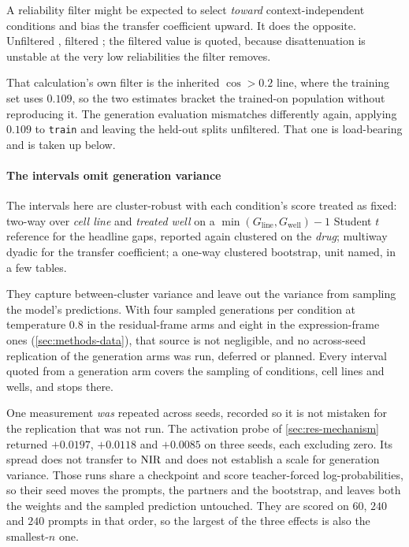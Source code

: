 A reliability filter might be expected to select \emph{toward}
context-in\-de\-pen\-dent conditions and bias the transfer coefficient upward.
It does the opposite. Unfiltered , filtered
; the filtered value is quoted, because disattenuation
is unstable at the very low reliabilities the filter removes.

That calculation's own filter is the inherited $\cos > 0.2$ line, where the
training set uses $0.109$, so the two estimates bracket the trained-on
population without reproducing it. The generation evaluation mismatches
differently again, applying $0.109$ to \texttt{train} and leaving the held-out
splits unfiltered. That one is load-bearing and is taken up below.

\paragraph{The intervals omit generation variance} The intervals here are
cluster-robust with each condition's score treated as fixed: two-way over
\emph{cell line} and \emph{treated well} on a $\min(G_{\textrm{line}},
G_{\textrm{well}}) - 1$ Student $t$ reference for the headline gaps, reported
again clustered on the \emph{drug}; multiway dyadic for the transfer
coefficient; a one-way clustered bootstrap, unit named, in a few tables.

They capture between-cluster variance and leave out the variance from sampling
the model's predictions. With four sampled generations per condition at temperature
$0.8$ in the residual-frame arms and eight in the expression-frame ones
(\cref{sec:methods-data}), that source is not negligible, and no across-seed
replication of the generation arms was run, deferred or planned. Every interval
quoted from a generation arm covers the sampling of conditions, cell lines and
wells, and stops there.

One measurement \emph{was} repeated across seeds, recorded so it is not mistaken
for the replication that was not run. The activation probe of
\cref{sec:res-mechanism} returned $+0.0197$, $+0.0118$ and $+0.0085$ on three
seeds, each excluding zero. Its spread does not transfer to $\textrm{NIR}$ and does not
establish a scale for generation variance. Those runs share a checkpoint and
score teacher-forced log-probabilities, so their seed moves the prompts, the
partners and the bootstrap, and leaves both the weights and the sampled
prediction untouched. They are scored on $60$, $240$ and $240$ prompts in that order, so
the largest of the three effects is also the smallest-$n$ one.

